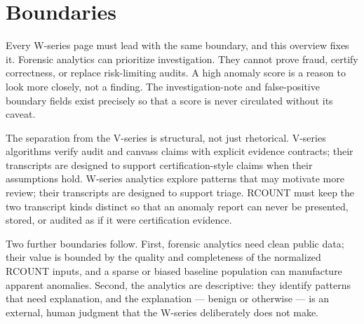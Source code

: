 \section{Boundaries}

Every W-series page must lead with the same boundary, and this overview fixes
it. Forensic analytics can prioritize investigation. They cannot prove fraud,
certify correctness, or replace risk-limiting audits. A high anomaly score is a
reason to look more closely, not a finding. The investigation-note and
false-positive boundary fields exist precisely so that a score is never
circulated without its caveat.

The separation from the V-series is structural, not just rhetorical. V-series
algorithms verify audit and canvass claims with explicit evidence contracts;
their transcripts are designed to support certification-style claims when their
assumptions hold. W-series analytics explore patterns that may motivate more
review; their transcripts are designed to support triage. RCOUNT must keep the
two transcript kinds distinct so that an anomaly report can never be presented,
stored, or audited as if it were certification evidence.

Two further boundaries follow. First, forensic analytics need clean public data;
their value is bounded by the quality and completeness of the normalized RCOUNT
inputs, and a sparse or biased baseline population can manufacture apparent
anomalies. Second, the analytics are descriptive: they identify patterns that
need explanation, and the explanation --- benign or otherwise --- is an external,
human judgment that the W-series deliberately does not make.
